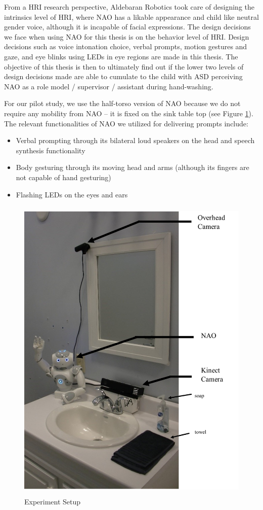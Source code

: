 From a HRI research perspective, Aldebaran Robotics took care of designing the intrinsics level of HRI, where NAO has a likable appearance and child like neutral gender voice, although it is incapable of facial expressions.  The design decisions we face when using NAO for this thesis is on the behavior level of HRI.  Design decisions such as voice intonation choice, verbal prompts, motion gestures and gaze, and eye blinks using LEDs in eye regions are made in this thesis.  The objective of this thesis is then to ultimately find out if the lower two levels of design decisions made are able to cumulate to the child with ASD perceiving NAO as a role model / supervisor / assistant during hand-washing.

For our pilot study, we use the half-torso version of NAO because we do not require any mobility from NAO -- it is fixed on the sink table top (see Figure \ref{fig:ExpSetup}).  The relevant functionalities of NAO we utilized for delivering prompts include:
\begin{itemize}
	\item Verbal prompting through its bilateral loud speakers on the head and speech synthesis functionality
	\item Body gesturing through its moving head and arms (although its fingers are not capable of hand gesturing)
	\item Flashing LEDs on the eyes and ears
\end{itemize}
\begin{figure} [h]
	\centering
	\includegraphics[height=15cm, keepaspectratio]{./img/exp_setup_labeled.jpg}
	\caption{Experiment Setup}
	\label{fig:ExpSetup}
\end{figure}


